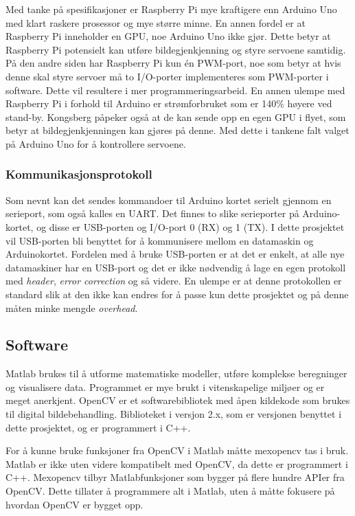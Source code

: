 Med tanke på spesifikasjoner er Raspberry Pi mye kraftigere enn Arduino Uno med klart raskere prosessor og mye større minne. En annen fordel er at Raspberry Pi inneholder en GPU, noe Arduino Uno ikke gjør. Dette betyr at Raspberry Pi potensielt kan utføre bildegjenkjenning og styre servoene samtidig. På den andre siden har Raspberry Pi kun én PWM-port, noe som betyr at hvis denne skal styre servoer må to I/O-porter implementeres som PWM-porter i software. Dette vil resultere i mer programmeringsarbeid. En annen ulempe med Raspberry Pi i forhold til Arduino er strømforbruket som er 140\% høyere ved stand-by.\cite{ArduinoSpec,RpiSpec} Kongsberg påpeker også at de kan sende opp en egen GPU i flyet, som betyr at bildegjenkjenningen kan gjøres på denne. Med dette i tankene falt valget på Arduino Uno for å kontrollere servoene.

\subsubsection{Kommunikasjonsprotokoll}

Som nevnt kan det sendes kommandoer til Arduino kortet serielt gjennom en serieport, som også kalles en UART. Det finnes to slike serieporter på Arduino-kortet, og disse er USB-porten og I/O-port 0 (RX) og 1 (TX). I dette prosjektet vil USB-porten bli benyttet for å kommunisere mellom en datamaskin og Arduinokortet. Fordelen med å bruke USB-porten er at det er enkelt, at alle nye datamaskiner har en USB-port og det er ikke nødvendig å lage en egen protokoll med \emph{header}, \emph{error correction} og så videre. En ulempe er at denne protokollen er standard slik at den ikke kan endres for å passe kun dette prosjektet og på denne måten minke mengde \emph{overhead}.

\subsection{Software}

Matlab brukes til å utforme matematiske modeller, utføre komplekse beregninger og visualisere data. \cite{matlab} Programmet er mye brukt i vitenskapelige miljøer og er meget anerkjent. 
OpenCV er et softwarebibliotek med åpen kildekode som brukes til digital bildebehandling. Biblioteket i versjon 2.x, som er versjonen benyttet i dette prosjektet, og er programmert i C++. \cite{docs:opencv}

For å kunne bruke funksjoner fra OpenCV i Matlab måtte mexopencv tas i bruk. Matlab er ikke uten videre kompatibelt med OpenCV, da dette er programmert i C++. Mexopencv tilbyr Matlabfunksjoner som bygger på flere hundre APIer fra OpenCV. \cite{mexopencv} Dette tillater å programmere alt i Matlab, uten å måtte fokusere på hvordan OpenCV er bygget opp. 
